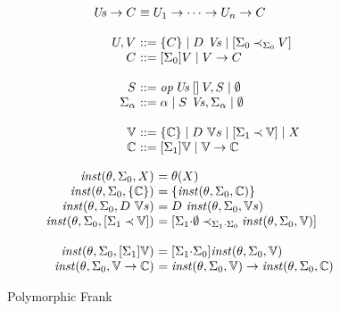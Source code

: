 \documentclass[preprint]{sigplanconf}
\begin{document}
\newcommand{\nothing}{\emptyset}

\begin{figure*}[p]

\newcommand{\asigs}[1]{\Sigma_{#1}}
\newcommand{\csigs}{\asigs{0}}
\newcommand{\osigs}{\asigs{1}}

\renewcommand{\instts}[1]{\inst{\theta}{\csigs}{#1}}

\newcommand{\appsig}[2]{{#1}\mathord{\cdot}{#2}}


\[
\begin{array}{@{}r@{~}l@{}}
\Us \to \C &\equiv \U_1 \to \dots \to \U_n \to \C \\
\\
\U, \V &::= \thunk{\C} \mid \D~\Vs \mid \handleType{\csigs}{\csigs}{\V} \\
\C     &::= \ret{\csigs}{\V} \mid \V \to \C \\
\\
S &::= \template{\op\,\Us}{}{\V}, S \mid \nothing \\
\asigs{\alpha} &::= \alpha \mid S~\Vs, \asigs{\alpha} \mid \nothing \\
\\
\VV &::= \thunk{\CC} \mid \D~\VVs \mid \handleTypePoly{\osigs}{\VV} \mid \X \\
\CC &::= \ret{\osigs}{\VV} \mid \VV \to \CC \\
\end{array}
\]

\[
\begin{array}{@{}r@{~}l@{\quad}l@{}}
\instts{\X}          &= \theta(\X) \\
\instts{\thunk{\CC}} &= \thunk{\instts{\CC}} \\
\instts{\D~\VVs}     &= \D~\instts{\VVs} \\
\instts{\handleTypePoly{\osigs}{\VV}} 
                     &= \handleType{\appsig{\osigs}{\nothing}}
                                   {\appsig{\osigs}{\csigs}}
                                   {\instts{\VV}} \\
\\
\instts{\ret{\osigs}{\VV}} &= \ret{\appsig{\osigs}{\csigs}}{\instts{\VV}} \\
\instts{\VV \to \CC}       &= \instts{\VV} \to \instts{\CC} \\
\end{array}
\]


\caption{Polymorphic Frank}
\end{figure*}


\end{document}
